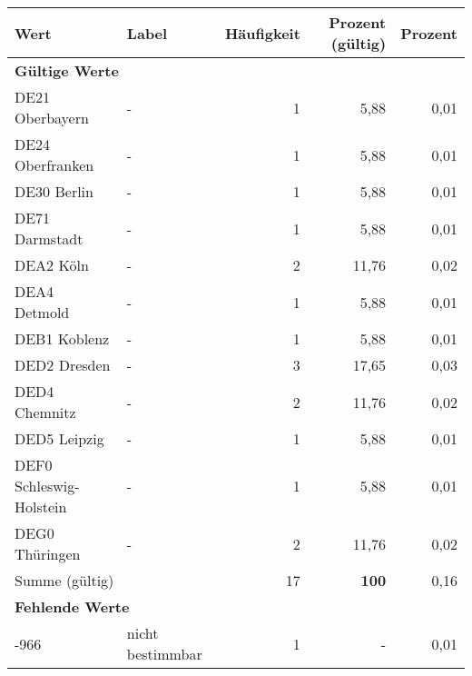      \begin{longtable}{Xlrrr}
     \toprule
     \textbf{Wert} & \textbf{Label} & \textbf{Häufigkeit} & \textbf{Prozent (gültig)} & \textbf{Prozent} \\
     \endhead
     \midrule
     \multicolumn{5}{l}{\textbf{Gültige Werte}}\\

     \multicolumn{1}{X}{DE21 Oberbayern} &
     - &
     1 &
     5,88 &
     0,01 \\

     \multicolumn{1}{X}{DE24 Oberfranken} &
     - &
     1 &
     5,88 &
     0,01 \\

     \multicolumn{1}{X}{DE30 Berlin} &
     - &
     1 &
     5,88 &
     0,01 \\

     \multicolumn{1}{X}{DE71 Darmstadt} &
     - &
     1 &
     5,88 &
     0,01 \\

     \multicolumn{1}{X}{DEA2 Köln} &
     - &
     2 &
     11,76 &
     0,02 \\

     \multicolumn{1}{X}{DEA4 Detmold} &
     - &
     1 &
     5,88 &
     0,01 \\

     \multicolumn{1}{X}{DEB1 Koblenz} &
     - &
     1 &
     5,88 &
     0,01 \\

     \multicolumn{1}{X}{DED2 Dresden} &
     - &
     3 &
     17,65 &
     0,03 \\

     \multicolumn{1}{X}{DED4 Chemnitz} &
     - &
     2 &
     11,76 &
     0,02 \\

     \multicolumn{1}{X}{DED5 Leipzig} &
     - &
     1 &
     5,88 &
     0,01 \\

     \multicolumn{1}{X}{DEF0 Schleswig-Holstein} &
     - &
     1 &
     5,88 &
     0,01 \\

     \multicolumn{1}{X}{DEG0 Thüringen} &
     - &
     2 &
     11,76 &
     0,02 \\
     \midrule
      \multicolumn{2}{l}{Summe (gültig)} & 17 &
      \textbf{100} &
         0,16 \\
     \multicolumn{5}{l}{\textbf{Fehlende Werte}}\\
       -966 & nicht bestimmbar & 1 & - & 0,01 \\


\end{longtable}
